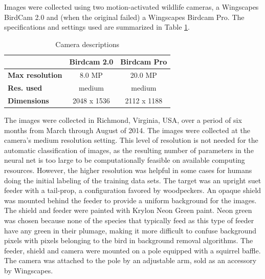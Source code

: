 \documentclass[11pt,twocolumn]{article}
\begin{document}
Images were collected using two motion-activated wildlife cameras, a Wingscapes BirdCam 2.0 and (when the original failed) a Wingscapes Birdcam Pro. The
specifications and settings used are summarized in Table \ref{table:cameras}.
\begin{table}[h]
  \caption{Camera descriptions}
  \label{table:cameras}
  \begin{center}
    \begin{tabular}{|>{\footnotesize}l|>{\footnotesize}c|>{\footnotesize}c|}
      \hline
      & \bf{Birdcam 2.0} & \bf{Birdcam Pro} \\ \hline
      \bf{Max resolution} & 8.0 MP & 20.0 MP \\ \hline
      \bf{Res. used} & medium & medium \\ \hline
      \bf{Dimensions} & 2048 x 1536 & 2112 x 1188 \\ \hline
    \end{tabular}
  \end{center}
\end{table} 
The images were collected
in Richmond, Virginia, USA, over a period of six months from
March through August of 2014. The images
were collected at the camera's medium resolution setting. This level of
resolution is not needed for the automatic classification of images,
as the resulting number of parameters in the neural net is too large
to be computationally feasible on available computing resources.
However, the higher resolution was helpful in some cases for humans
doing the initial labeling of the training data sets.
The target was an upright suet feeder with a
tail-prop, a configuration favored by woodpeckers. An opaque shield
was mounted behind the feeder to provide a uniform background for the
images. The shield and feeder were painted with Krylon Neon Green paint.
Neon green was chosen because none of the species that typically feed
as this type of feeder have any green in their plumage, making it more
difficult to confuse background pixels with pixels belonging to the
bird in background removal algorithms. The feeder, shield and camera
were mounted on a pole equipped with a squirrel baffle. The camera was
attached to the pole by an adjustable arm, sold as an accessory by
Wingscapes.
\end{document}
